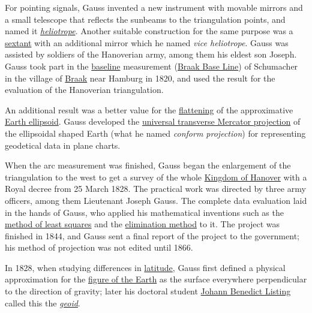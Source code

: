 For pointing signals, Gauss invented a new instrument with movable mirrors and a small telescope that reflects the sunbeams to the triangulation points, and named it \emph{\href{https://en.wikipedia.org/wiki/Heliotrope_(instrument)}{heliotrope}}. Another suitable construction for the same purpose was a \href{https://en.wikipedia.org/wiki/Sextant}{sextant} with an additional mirror which he named \emph{vice heliotrope}. Gauss was assisted by soldiers of the Hanoverian army, among them his eldest son Joseph. Gauss took part in the \href{https://en.wikipedia.org/wiki/Baseline_(surveying)}{baseline} measurement (\href{https://en.wikipedia.org/wiki/Braak_Base_Line}{Braak Base Line}) of Schumacher in the village of \href{https://en.wikipedia.org/wiki/Braak,_Schleswig-Holstein}{Braak} near Hamburg in 1820, and used the result for the evaluation of the Hanoverian triangulation.

An additional result was a better value for the \href{https://en.wikipedia.org/wiki/Flattening}{flattening} of the approximative \href{https://en.wikipedia.org/wiki/Earth_ellipsoid}{Earth ellipsoid}. Gauss developed the \href{https://en.wikipedia.org/wiki/Transverse_Mercator_projection\#Ellipsoidal_transverse_Mercator}{universal transverse Mercator projection} of the ellipsoidal shaped Earth (what he named \emph{conform projection}) for representing geodetical data in plane charts.

When the arc measurement was finished, Gauss began the enlargement of the triangulation to the west to get a survey of the whole \href{https://en.wikipedia.org/wiki/Kingdom_of_Hanover}{Kingdom of Hanover} with a Royal decree from 25 March 1828. The practical work was directed by three army officers, among them Lieutenant Joseph Gauss. The complete data evaluation laid in the hands of Gauss, who applied his mathematical inventions such as the \href{https://en.wikipedia.org/wiki/Method_of_least_squares}{method of least squares} and the \href{https://en.wikipedia.org/wiki/Gaussian_elimination}{elimination method} to it. The project was finished in 1844, and Gauss sent a final report of the project to the government; his method of projection was not edited until 1866.

In 1828, when studying differences in \href{https://en.wikipedia.org/wiki/Latitude}{latitude}, Gauss first defined a physical approximation for the \href{https://en.wikipedia.org/wiki/Figure_of_the_Earth}{figure of the Earth} as the surface everywhere perpendicular to the direction of gravity; later his doctoral student \href{https://en.wikipedia.org/wiki/Johann_Benedict_Listing}{Johann Benedict Listing} called this the \emph{\href{https://en.wikipedia.org/wiki/Geoid}{geoid}}.



